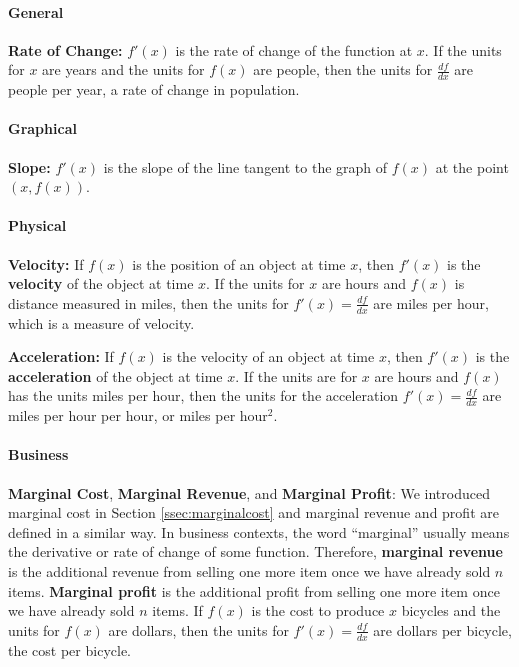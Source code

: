 \paragraph*{General}
{\bf Rate of Change:} $f'(x)$ is the rate of change of the function at $x$. If the units for $x$ are years and the units for $f(x)$ are people, then the units for $\frac{df}{dx}$ are people per year, a rate of change in population.

\paragraph*{Graphical}
{\bf Slope:} $f'(x)$ is the slope of the line tangent to the graph of $f(x)$ at the point $(x,f(x))$.

\paragraph*{Physical}
{\bf Velocity:} If $f(x)$ is the position of an object at time $x$, then $f'(x)$ is the {\bf velocity} of the object at time $x$. If the units for $x$ are hours and $f(x)$ is distance measured in miles, then the units for $f'(x)=\frac{df}{dx}$ are miles per hour, which is a measure of velocity.

{\bf Acceleration:} If $f(x)$ is the velocity of an object at time $x$, then $f'(x)$ is the {\bf acceleration} of the object at time $x$. If the units are for $x$ are hours and $f(x)$ has the units miles per hour, then the units for the acceleration $f'(x)=\frac{df}{dx}$ are miles per hour per hour, or miles per hour$^2$.

\paragraph*{Business}
{\bf Marginal Cost}, {\bf Marginal Revenue}, and {\bf Marginal Profit}: We introduced marginal cost in Section \ref{ssec:marginalcost} and marginal revenue and profit are defined in a similar way. In business contexts, the word ``marginal'' usually means the derivative or rate of change of some function. Therefore, {\bf marginal revenue} is the additional revenue from selling one more item once we have already sold $n$ items. {\bf Marginal profit} is the additional profit from selling one more item once we have already sold $n$ items. If $f(x)$ is the cost to produce $x$ bicycles and the units for $f(x)$ are dollars, then the units for $f'(x)=\frac{df}{dx}$ are dollars per bicycle, the cost per bicycle.

